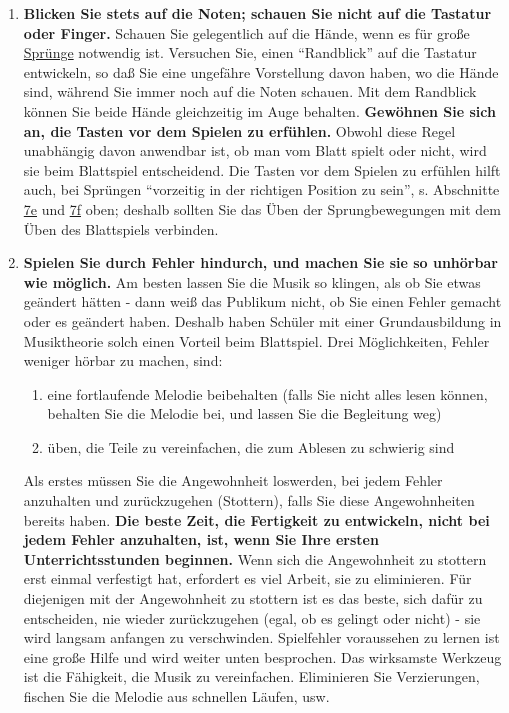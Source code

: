 \begin{enumerate}[label={\arabic*.}] 
\item \textbf{Blicken Sie stets auf die Noten; schauen Sie nicht auf die Tastatur oder Finger.}
Schauen Sie gelegentlich auf die Hände, wenn es für große \hyperref[c1iii7f]{Sprünge} notwendig ist.
Versuchen Sie, einen \enquote{Randblick} auf die Tastatur entwickeln, so daß Sie eine ungefähre Vorstellung davon haben, wo die Hände sind, während Sie immer noch auf die Noten schauen.
Mit dem Randblick können Sie beide Hände gleichzeitig im Auge behalten.
\textbf{Gewöhnen Sie sich an, die Tasten vor dem Spielen zu erfühlen.}
Obwohl diese Regel unabhängig davon anwendbar ist, ob man vom Blatt spielt oder nicht, wird sie beim Blattspiel entscheidend.
Die Tasten vor dem Spielen zu erfühlen hilft auch, bei Sprüngen \enquote{vorzeitig in der richtigen Position zu sein}, s. Abschnitte \hyperref[c1iii7e]{7e} und \hyperref[c1iii7f]{7f} oben; deshalb sollten Sie das Üben der Sprungbewegungen mit dem Üben des Blattspiels verbinden.


\item \textbf{Spielen Sie durch Fehler hindurch, und machen Sie sie so unhörbar wie möglich.}
Am besten lassen Sie die Musik so klingen, als ob Sie etwas geändert hätten - dann weiß das Publikum nicht, ob Sie einen Fehler gemacht oder es geändert haben.
Deshalb haben Schüler mit einer Grundausbildung in Musiktheorie solch einen Vorteil beim Blattspiel.
Drei Möglichkeiten, Fehler weniger hörbar zu machen, sind:

\begin{enumerate}[label={\roman*.}] 
<li>den Rhythmus intakt halten
\item eine fortlaufende Melodie beibehalten (falls Sie nicht alles lesen können, behalten Sie die Melodie bei, und lassen Sie die Begleitung weg)
\item üben, die Teile zu vereinfachen, die zum Ablesen zu schwierig sind
 \end{enumerate}
Als erstes müssen Sie die Angewohnheit loswerden, bei jedem Fehler anzuhalten und zurückzugehen (Stottern), falls Sie diese Angewohnheiten bereits haben.
\textbf{Die beste Zeit, die Fertigkeit zu entwickeln, nicht bei jedem Fehler anzuhalten, ist, wenn Sie Ihre ersten Unterrichtsstunden beginnen.}
Wenn sich die Angewohnheit zu stottern erst einmal verfestigt hat, erfordert es viel Arbeit, sie zu eliminieren.
Für diejenigen mit der Angewohnheit zu stottern ist es das beste, sich dafür zu entscheiden, nie wieder zurückzugehen (egal, ob es gelingt oder nicht) - sie wird langsam anfangen zu verschwinden.
Spielfehler voraussehen zu lernen ist eine große Hilfe und wird weiter unten besprochen.
Das wirksamste Werkzeug ist die Fähigkeit, die Musik zu vereinfachen.
Eliminieren Sie Verzierungen, fischen Sie die Melodie aus schnellen Läufen, usw.


\end{enumerate}
